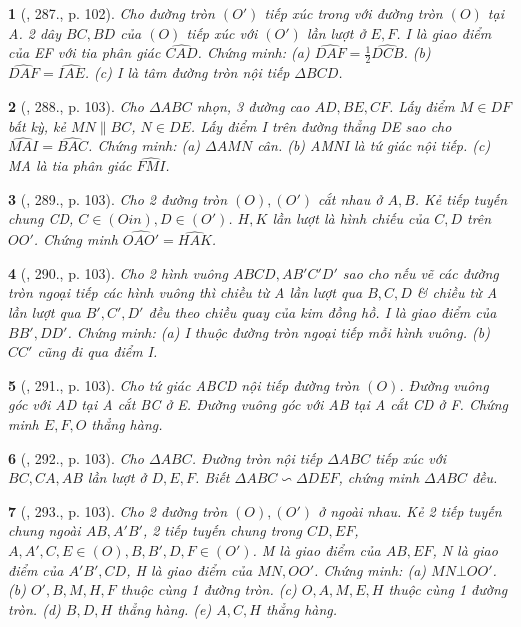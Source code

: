 \documentclass{article}
\newtheorem{baitoan}{}
\begin{document}
\begin{baitoan}[\cite{Binh_Toan_9_tap_2}, 287., p. 102]
	Cho đường tròn $(O')$ tiếp xúc trong với đường tròn $(O)$ tại A. 2 dây $BC,BD$ của $(O)$ tiếp xúc với $(O')$ lần lượt ở $E,F$. I là giao điểm của EF với tia phân giác $\widehat{CAD}$. Chứng minh: (a) $\widehat{DAF} = \frac{1}{2}\widehat{DCB}$. (b) $\widehat{DAF} = \widehat{IAE}$. (c) I là tâm đường tròn nội tiếp $\Delta BCD$.
\end{baitoan}

\begin{baitoan}[\cite{Binh_Toan_9_tap_2}, 288., p. 103]
	Cho $\Delta ABC$ nhọn, 3 đường cao $AD,BE,CF$. Lấy điểm $M\in DF$ bất kỳ, kẻ $MN\parallel BC$, $N\in DE$. Lấy điểm I trên đường thẳng DE sao cho $\widehat{MAI} = \widehat{BAC}$. Chứng minh: (a) $\Delta AMN$ cân. (b) AMNI là tứ giác nội tiếp. (c) MA là tia phân giác $\widehat{FMI}$.
\end{baitoan}

\begin{baitoan}[\cite{Binh_Toan_9_tap_2}, 289., p. 103]
	Cho 2 đường tròn $(O),(O')$ cắt nhau ở $A,B$. Kẻ tiếp tuyến chung CD, $C\in(Oin),D\in(O')$. $H,K$ lần lượt là hình chiếu của $C,D$ trên $OO'$. Chứng minh $\widehat{OAO'} = \widehat{HAK}$.
\end{baitoan}

\begin{baitoan}[\cite{Binh_Toan_9_tap_2}, 290., p. 103]
	Cho 2 hình vuông $ABCD,AB'C'D'$ sao cho nếu vẽ các đường tròn ngoại tiếp các hình vuông thì chiều từ A lần lượt qua $B,C,D$ \& chiều từ A lần lượt qua $B',C',D'$ đều theo chiều quay của kim đồng hồ. I là giao điểm của $BB',DD'$. Chứng minh: (a) I thuộc đường tròn ngoại tiếp mỗi hình vuông. (b) $CC'$ cũng đi qua điểm I.
\end{baitoan}

\begin{baitoan}[\cite{Binh_Toan_9_tap_2}, 291., p. 103]
	Cho tứ giác ABCD nội tiếp đường tròn $(O)$. Đường vuông góc với AD tại A cắt BC ở E. Đường vuông góc với AB tại A cắt CD ở F. Chứng minh $E,F,O$ thẳng hàng.
\end{baitoan}

\begin{baitoan}[\cite{Binh_Toan_9_tap_2}, 292., p. 103]
	Cho $\Delta ABC$. Đường tròn nội tiếp $\Delta ABC$ tiếp xúc với $BC,CA,AB$ lần lượt ở $D,E,F$. Biết $\Delta ABC\backsim\Delta DEF$, chứng minh $\Delta ABC$ đều.
\end{baitoan}

\begin{baitoan}[\cite{Binh_Toan_9_tap_2}, 293., p. 103]
	Cho 2 đường tròn $(O),(O')$ ở ngoài nhau. Kẻ 2 tiếp tuyến chung ngoài $AB,A'B'$, 2 tiếp tuyến chung trong $CD,EF$, $A,A',C,E\in(O),B,B',D,F\in(O')$. M là giao điểm của $AB,EF$, N là giao điểm của $A'B',CD$, H là giao điểm của $MN,OO'$. Chứng minh: (a) $MN\bot OO'$. (b) $O',B,M,H,F$ thuộc cùng 1 đường tròn. (c) $O,A,M,E,H$ thuộc cùng 1 đường tròn. (d) $B,D,H$ thẳng hàng. (e) $A,C,H$ thẳng hàng.
\end{baitoan}
\end{document}
